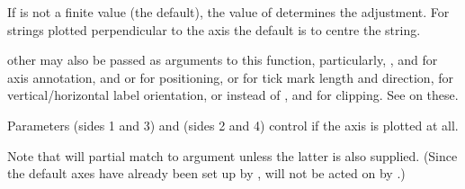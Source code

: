 \begin{Arguments}
\begin{ldescription}
If  is not a finite value (the default), the value of
 determines the adjustment.  For strings plotted
perpendicular to the axis the default is to centre the string.

\item[\code{...}] other  may also be passed as
arguments to this function, particularly, ,
 and  for axis annotation, 
and  or  for positioning,  or
 for tick mark length and direction,  for
vertical/horizontal label orientation, or  instead of
, and  for clipping.  See  on these.

Parameters  (sides 1 and 3) and  (sides 2 and
4) control if the axis is plotted at all.

Note that  will partial match to argument
 unless the latter is also supplied.  (Since the
default axes have already been set up by ,
 will not be acted on by .)
\end{ldescription}
\end{Arguments}
%
